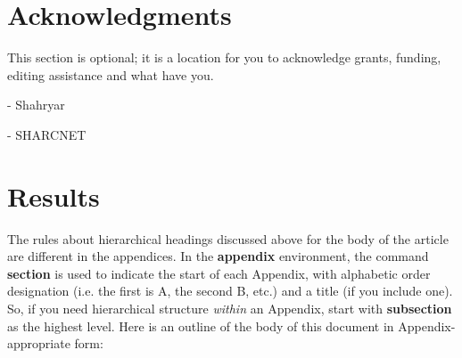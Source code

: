 \documentclass{sig-alternate}
\begin{document}
\section{Acknowledgments}
This section is optional; it is a location for you
to acknowledge grants, funding, editing assistance and
what have you.

- Shahryar

- SHARCNET


%

%
%

\appendix
\section{Results}
The rules about hierarchical headings discussed above for
the body of the article are different in the appendices.
In the \textbf{appendix} environment, the command
\textbf{section} is used to
indicate the start of each Appendix, with alphabetic order
designation (i.e. the first is A, the second B, etc.) and
a title (if you include one).  So, if you need
hierarchical structure
\textit{within} an Appendix, start with \textbf{subsection} as the
highest level. Here is an outline of the body of this
document in Appendix-appropriate form:
\end{document}
